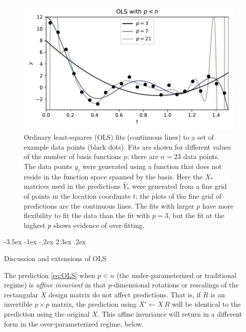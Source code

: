 \documentclass[12pt,letterpaper]{article}
\makeatletter
\newlength{\figurewidth}
\renewcommand\section{\@startsection {section}{1}{\z@}%
  {-3.5ex \@plus -1ex \@minus -.2ex}%
  {2.3ex \@plus.2ex}%
  {\raggedright\normalfont\Large\bfseries}}
\makeatother
\begin{document}
\begin{figure}[t]
    \begin{mdframed}
    \includegraphics[width=\figurewidth]{paper/OLS-under.pdf}
    \caption{Ordinary least-squares (OLS) fits (continuous lines) to a set of example data points (black dots). Fits are shown for different values of the number of basis functions $p$; there are $n=23$ data points. The data points $y_i$ were generated using a function that does not reside in the function space spanned by the basis. Here the $X_\ast$ matrices used in the predictions $\hat{Y}_\ast$ were generated from a fine grid of points in the location coordinate $t$; the plots of the fine grid of predictions are the continuous lines. The fits with larger $p$ have more flexibility to fit the data than the fit with $p=3$, but the fit at the highest $p$ shows evidence of over-fitting.}
    \label{fig:ols1}
    \end{mdframed}
\end{figure}

\section{Discussion and extensions of OLS}

The prediction \eqref{eq:OLS} when $p<n$ (the under-parameterized or traditional regime) is \emph{affine invariant} in that $p$-dimensional rotations or rescalings of the rectangular $X$ design matrix do not affect predictions.
That is, if $R$ is an invertible $p\times p$ matrix, the prediction using $X'\leftarrow X\,R$ will be identical to the prediction using the original $X$.
This affine invariance will return in a different form in the over-parameterized regime, below.
\end{document}
